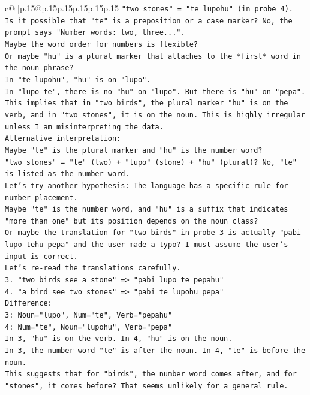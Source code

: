 \documentclass{article}
\begin{document}
{\begin{supertabular}{c@{$\;$}|p{.15\linewidth}@{}p{.15\linewidth}p{.15\linewidth}p{.15\linewidth}p{.15\linewidth}p{.15\linewidth}}
{{{\texttt{"two stones" = "te lupohu" (in probe 4).} \\
\texttt{Is it possible that "te" is a preposition or a case marker? No, the prompt says "Number words: two, three...".} \\
\texttt{Maybe the word order for numbers is flexible?} \\
\texttt{Or maybe "hu" is a plural marker that attaches to the *first* word in the noun phrase?} \\
\texttt{In "te lupohu", "hu" is on "lupo".} \\
\texttt{In "lupo te", there is no "hu" on "lupo". But there is "hu" on "pepa".} \\
\texttt{This implies that in "two birds", the plural marker "hu" is on the verb, and in "two stones", it is on the noun. This is highly irregular unless I am misinterpreting the data.} \\
\texttt{Alternative interpretation:} \\
\texttt{Maybe "te" is the plural marker and "hu" is the number word?} \\
\texttt{"two stones" = "te" (two) + "lupo" (stone) + "hu" (plural)? No, "te" is listed as the number word.} \\
\texttt{Let's try another hypothesis: The language has a specific rule for number placement.} \\
\texttt{Maybe "te" is the number word, and "hu" is a suffix that indicates "more than one" but its position depends on the noun class?} \\
\texttt{Or maybe the translation for "two birds" in probe 3 is actually "pabi lupo tehu pepa" and the user made a typo? I must assume the user's input is correct.} \\
\texttt{Let's re{-}read the translations carefully.} \\
\texttt{3. "two birds see a stone" => "pabi lupo te pepahu"} \\
\texttt{4. "a bird see two stones" => "pabi te lupohu pepa"} \\
\texttt{Difference:} \\
\texttt{3: Noun="lupo", Num="te", Verb="pepahu"} \\
\texttt{4: Num="te", Noun="lupohu", Verb="pepa"} \\
\texttt{In 3, "hu" is on the verb. In 4, "hu" is on the noun.} \\
\texttt{In 3, the number word "te" is after the noun. In 4, "te" is before the noun.} \\
\texttt{This suggests that for "birds", the number word comes after, and for "stones", it comes before? That seems unlikely for a general rule.} \\
}}}
\end{supertabular}}
\end{document}
